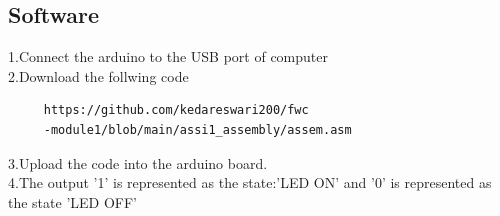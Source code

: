 \documentclass[10pt]{report}
\begin{document}
\begin{multicols}{2}
\section{Software}
  1.Connect the arduino to the USB port of computer
  \\
  2.Download the follwing code
  \begin{lstlisting}
     https://github.com/kedareswari200/fwc
     -module1/blob/main/assi1_assembly/assem.asm
  \end{lstlisting}
  
  3.Upload the code into the arduino board.
  \\
  4.The output '1' is represented as the state:'LED ON' and '0' is represented as the state 'LED OFF'

\end{multicols}
\end{document}
